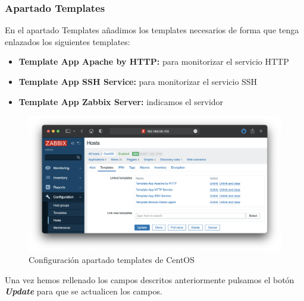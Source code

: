 \subsubsection{Apartado Templates}
En el apartado Templates añadimos los templates necesarios de forma que tenga enlazados los siguientes templates:
    \begin{itemize}
        \item \textbf{Template App Apache by HTTP:} para monitorizar el servicio HTTP
        \item \textbf{Template App SSH Service:} para monitorizar el servicio SSH
        \item \textbf{Template App Zabbix Server:} indicamos el servidor
    \end{itemize}
    \begin{figure}[H]
        \centering
        \includegraphics[scale=0.45]{images/centos_templates.png}
        \caption{Configuración apartado templates de CentOS}
        \label{fig:centos_templates}
    \end{figure}
Una vez hemos rellenado los campos descritos anteriormente pulsamos el botón \textbf{\emph{Update}} para que se actualicen los campos.

